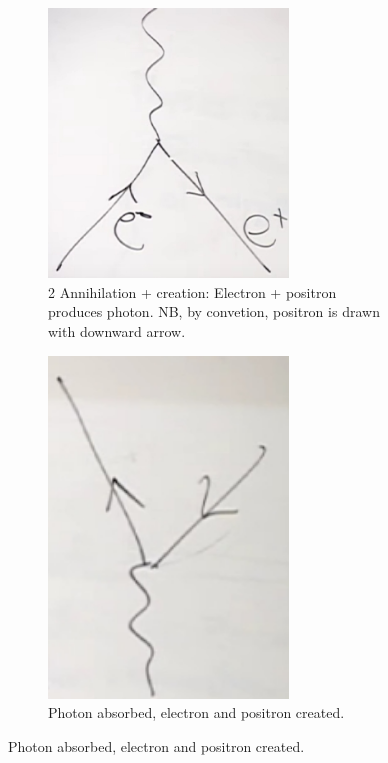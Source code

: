 \documentclass[]{article}
\begin{document}
\begin{figure}[H]
\begin{subfigure}{0.48\textwidth}
	\end{subfigure}
	\begin{subfigure}{0.48\textwidth}
		\caption{2 Annihilation +  creation: Electron + positron produces photon. NB, by convetion, positron is drawn with downward arrow.}
		\includegraphics[width=0.7\textwidth]{em-dirac3}
	\end{subfigure}
	\begin{subfigure}{0.48\textwidth}
		\caption{Photon absorbed, electron and positron created.}
		\includegraphics[width=0.7\textwidth]{em-dirac4}

\end{subfigure}
\end{figure}
\end{document}
